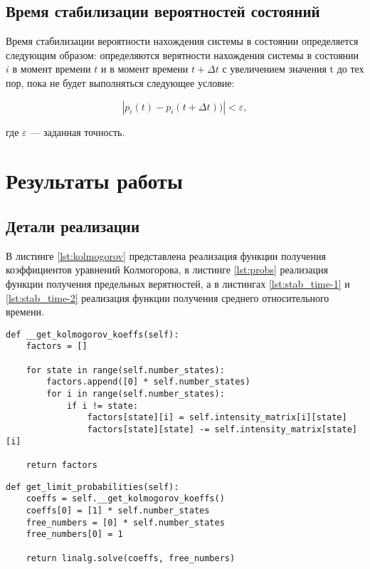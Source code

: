 \subsection*{Время стабилизации вероятностей состояний}

Время стабилизации вероятности нахождения системы в состоянии определяется следующим образом: определяются верятности нахождения системы в состоянии $i$ в момент времени $t$ и в момент времени $t + \varDelta t$ с увеличением значения t до тех пор, пока не будет выполняться следующее условие:

\begin{equation*}
 | p_{i}(t) - p_{i}(t + \varDelta t))| < \varepsilon,
\end{equation*}

где $\varepsilon$ --- заданная точность.

\section*{Результаты работы}

\subsection*{Детали реализации}

В листинге \ref{lst:kolmogorov} представлена реализация функции получения коэффициентов уравнений Колмогорова, в листинге \ref{lst:probs} реализация функции получения предельных верятностей, а в листингах \ref{lst:stab_time-1} и \ref{lst:stab_time-2} реализация функции получения среднего относительного времени.
\clearpage

\begin{center}
\captionsetup{justification=raggedright,singlelinecheck=off}
\begin{lstlisting}[label=lst:kolmogorov,caption=Реализация функции получения коэффициентов уравнений Колмогорова]
def __get_kolmogorov_koeffs(self):
    factors = []

    for state in range(self.number_states):
        factors.append([0] * self.number_states)
        for i in range(self.number_states):
            if i != state:
                factors[state][i] = self.intensity_matrix[i][state]
                factors[state][state] -= self.intensity_matrix[state][i]

    return factors
\end{lstlisting}
\end{center}

\begin{center}
\captionsetup{justification=raggedright,singlelinecheck=off}
\begin{lstlisting}[label=lst:probs,caption=Реализация функции получения предельных вероятностей]
def get_limit_probabilities(self):
    coeffs = self.__get_kolmogorov_koeffs()
    coeffs[0] = [1] * self.number_states
    free_numbers = [0] * self.number_states
    free_numbers[0] = 1

    return linalg.solve(coeffs, free_numbers)
\end{lstlisting}
\end{center}


